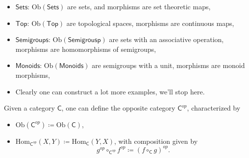 \begin{ex}\leavevmode\vspace{-.2\baselineskip}
	\begin{itemize}
		\item $\mathsf{Sets}$: $\mathrm{Ob} \left(\mathsf{Sets}\right)$ are sets, and morphisms are set theoretic maps,
		\item $\mathsf{Top}$: $\mathrm{Ob} \left(\mathsf{Top}\right)$ are topological spaces, morphisms are continuous maps,
		\item $\mathsf{Semigroups}$: $\mathrm{Ob} \left(\mathsf{Semigrousp}\right)$ are sets with an associative operation, morphisms are homomorphisms of semigroups,
		\item $\mathsf{Monoids}$: $\mathrm{Ob} \left(\mathsf{Monoids}\right)$ are semigroups with a unit, morphisms are monoid morphisms,
		\item Clearly one can construct a lot more examples, we'll stop here.
	\end{itemize}
\end{ex} 

\begin{defn}
	Given a category $\mathsf{C}$, one can define the opposite category $\mathsf{C}^{op}$, characterized by
	\begin{itemize}
		\item $\mathrm{Ob}(\mathsf{C}^{op}) \coloneqq \mathrm{Ob}(\mathsf{C})$,
		\item $\mathrm{Hom}_{\mathsf{C}^{op}} \left( X, Y \right) \coloneqq \mathrm{Hom}_{\mathsf{C}} \left( Y, X \right)$, with composition given by
			\begin{equation}
				g^{op} \circ_{\mathsf{C}^{op}} f^{op} \coloneqq \left( f \circ_{\mathsf{C}} g \right)^{op}
			.\end{equation} 
	\end{itemize} 
\end{defn}

